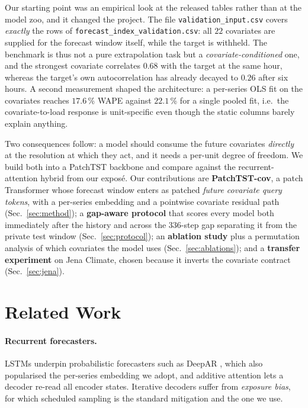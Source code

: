 \documentclass[10pt,twocolumn]{article}
\begin{document}
Our starting point was an empirical look at the released tables rather than at the
model zoo, and it changed the project. The file \texttt{validation\_input.csv}
covers \emph{exactly} the rows of \texttt{forecast\_index\_validation.csv}: all
$22$ covariates are supplied for the forecast window itself, while the target is
withheld. The benchmark is thus not a pure extrapolation task but a
\emph{covariate-conditioned} one, and the strongest covariate correlates $0.68$
with the target at the same hour, whereas the target's own autocorrelation has
already decayed to $0.26$ after six hours. A second measurement shaped the
architecture: a per-series OLS fit on the covariates reaches $17.6$\,\% WAPE
against $22.1$\,\% for a single pooled fit, i.e.\ the covariate-to-load response is
unit-specific even though the static columns barely explain anything.

Two consequences follow: a model should consume the future covariates
\emph{directly} at the resolution at which they act, and it needs a per-unit degree
of freedom. We build both into a PatchTST \cite{nie2023patchtst} backbone and
compare against the recurrent-attention hybrid from our expos\'e. Our contributions
are \textbf{PatchTST-cov}, a patch Transformer whose forecast window enters as
patched \emph{future covariate query tokens}, with a per-series embedding and a
pointwise covariate residual path (Sec.~\ref{sec:method}); a \textbf{gap-aware
protocol} that scores every model both immediately after the history and across the
$336$-step gap separating it from the private test window
(Sec.~\ref{sec:protocol}); an \textbf{ablation study} plus a permutation analysis
of which covariates the model uses (Sec.~\ref{sec:ablations}); and a
\textbf{transfer experiment} on Jena Climate, chosen because it inverts the
covariate contract (Sec.~\ref{sec:jena}).

\section{Related Work}

\paragraph{Recurrent forecasters.} LSTMs \cite{hochreiter1997lstm} underpin
probabilistic forecasters such as DeepAR \cite{salinas2020deepar}, which also
popularised the per-series embedding we adopt, and additive attention
\cite{bahdanau2015attention} lets a decoder re-read all encoder states. Iterative
decoders suffer from \emph{exposure bias}, for which scheduled sampling
\cite{bengio2015scheduled} is the standard mitigation and the one we use.
\end{document}
